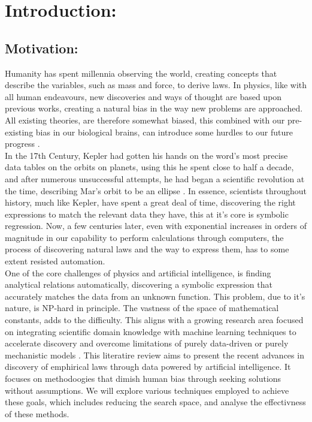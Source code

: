 \documentclass{article}
\begin{document}
\section{Introduction: }

\subsection{Motivation: }

Humanity has spent millennia observing the world, creating concepts that describe the variables, such as mass and force, to derive laws. In physics, like with
all human endeavours, new discoveries and ways of thought are based upon previous works, creating
a natural bias in the way new problems are approached. All existing theories, are therefore
somewhat biased, this combined with our pre-existing bias in our biological brains, can introduce some
hurdles to our future progress \cite{Wood2022} \cite{Schmidt2009}.\\

In the 17th Century, Kepler had gotten his hands on the word’s most precise data tables on the orbits
on planets, using this he spent close to half a decade, and after numerous unsuccessful
attempts, he had began a scientific revolution at the time, describing Mar’s orbit to be an ellipse \cite{kepler}.
In essence, scientists throughout history, much like Kepler, have spent a great deal of time, discovering
the right expressions to match the relevant data they have, this at it’s core is symbolic regression. Now,
a few centuries later, even with exponential increases in orders of magnitude in our capability to perform
calculations through computers, the process of discovering natural laws and the way to express them,
has to some extent resisted automation.\\


One of the core challenges of physics and artificial intelligence, is finding analytical relations automatically, discovering a symbolic expression that accurately matches the data from an unknown function.
This problem, due to it’s nature, is NP-hard \cite{Hope2023} in principle. The vastness of the space
of mathematical constants, adds to the difficulty. This aligns with a growing research area focused on integrating scientific domain knowledge with machine learning techniques to accelerate discovery and overcome limitations of purely data-driven or purely mechanistic models \cite{willard2022}.
This literatire review aims to present the recent advances in discovery of emphirical laws through data powered by artificial intelligence. It focuses on methodoogies that dimish human bias through seeking solutions without assumptions. We will explore various techniques employed to achieve these goals, which includes reducing the search space, and analyse the effectivness of these methods.\\  
\end{document}
